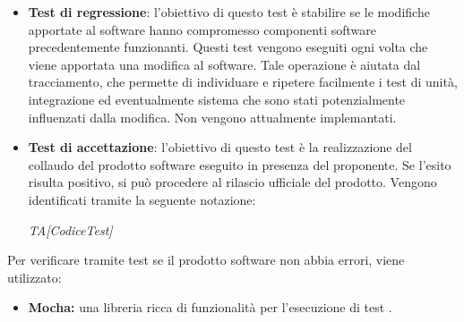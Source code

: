 \begin{itemize}
      \item \textbf{Test di regressione}: l'obiettivo di questo test è stabilire se le modifiche apportate al software hanno compromesso componenti software precedentemente funzionanti.
      Questi test vengono eseguiti ogni volta che viene apportata una modifica al software.
      Tale operazione è aiutata dal tracciamento, che permette di individuare e ripetere facilmente i test di unità, integrazione ed eventualmente sistema che sono stati potenzialmente influenzati dalla modifica.
Non vengono attualmente implemantati.
      \item \textbf{Test di accettazione}: l'obiettivo di questo test è la realizzazione del collaudo del prodotto software eseguito in presenza del proponente. Se l'esito risulta positivo, si può procedere al rilascio ufficiale del prodotto.
Vengono identificati tramite la seguente notazione:
\begin{center}
\emph{TA[CodiceTest]}
\end{center}
\end{itemize}





Per verificare tramite test se il prodotto software non abbia errori, viene utilizzato:
\begin{itemize}
\item \textbf{Mocha: } una libreria ricca di funzionalità per l'esecuzione di test .
\end{itemize}

